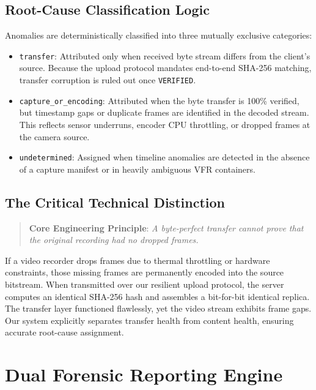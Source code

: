 \documentclass[11pt,a4paper]{article}
\begin{document}
\subsection{Root-Cause Classification Logic}
Anomalies are deterministically classified into three mutually exclusive categories:
\begin{itemize}[leftmargin=*,itemsep=1pt]
    \item \texttt{transfer}: Attributed only when received byte stream differs from the client's source. Because the upload protocol mandates end-to-end SHA-256 matching, transfer corruption is ruled out once \texttt{VERIFIED}.
    \item \texttt{capture\_or\_encoding}: Attributed when the byte transfer is 100\% verified, but timestamp gaps or duplicate frames are identified in the decoded stream. This reflects sensor underruns, encoder CPU throttling, or dropped frames at the camera source.
    \item \texttt{undetermined}: Assigned when timeline anomalies are detected in the absence of a capture manifest or in heavily ambiguous VFR containers.
\end{itemize}

\subsection{The Critical Technical Distinction}
\begin{quote}
\textbf{Core Engineering Principle}: \emph{A byte-perfect transfer cannot prove that the original recording had no dropped frames.}
\end{quote}
If a video recorder drops frames due to thermal throttling or hardware constraints, those missing frames are permanently encoded into the source bitstream. When transmitted over our resilient upload protocol, the server computes an identical SHA-256 hash and assembles a bit-for-bit identical replica. The transfer layer functioned flawlessly, yet the video stream exhibits frame gaps. Our system explicitly separates transfer health from content health, ensuring accurate root-cause assignment.

\section{Dual Forensic Reporting Engine}
\end{document}
